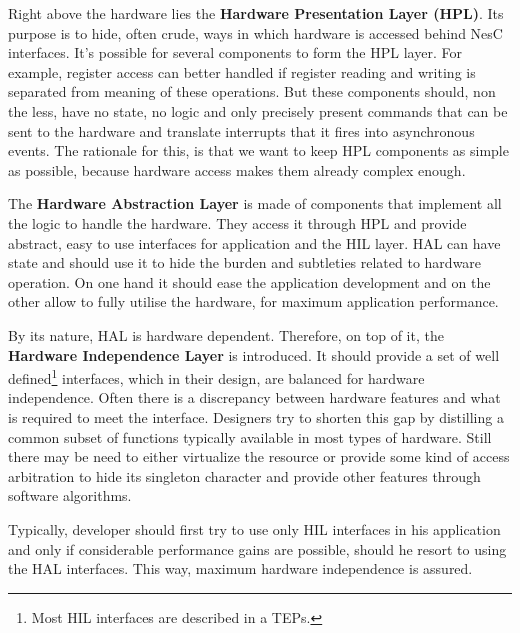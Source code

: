 Right above the hardware lies the {\bf Hardware Presentation Layer
(HPL)}. Its purpose is to hide, often crude, ways in which hardware is
accessed behind NesC interfaces. It's possible for several
components to form the HPL layer. For example, register access can
better handled if register reading and writing is separated from
meaning of these operations. But these components should, non the
less, have no state, no logic and only precisely present commands that
can be sent to the hardware and translate interrupts that it fires
into asynchronous events. The rationale for this, is that we want to
keep HPL components as simple as possible, because hardware access
makes them already complex enough.

The {\bf Hardware Abstraction Layer} is made of components that
implement all the logic to handle the hardware. They access it through
HPL and provide abstract, easy to use interfaces for application and
the HIL layer. HAL can have state and should use it to hide the burden
and subtleties related to hardware operation. On one hand it should
ease the application development and on the other allow to fully
utilise the hardware, for maximum application performance.

By its nature, HAL is hardware dependent. Therefore, on top of it,
the {\bf Hardware Independence Layer} is introduced. It should provide
a set of well defined\footnote{Most HIL interfaces are described in a
TEPs.} interfaces, which in their design, are balanced for hardware
independence. Often there is a discrepancy between hardware features
and what is required to meet the interface.  Designers try to shorten
this gap by distilling a common subset of functions typically
available in most types of hardware. Still there may be need to either
virtualize the resource or provide some kind of access arbitration to
hide its singleton character and provide other features through
software algorithms.

Typically, developer should first try to use only HIL interfaces in
his application and only if considerable performance gains are possible,
should he resort to using the HAL interfaces. This way, maximum
hardware independence is assured.






\label{haa_arch} %




